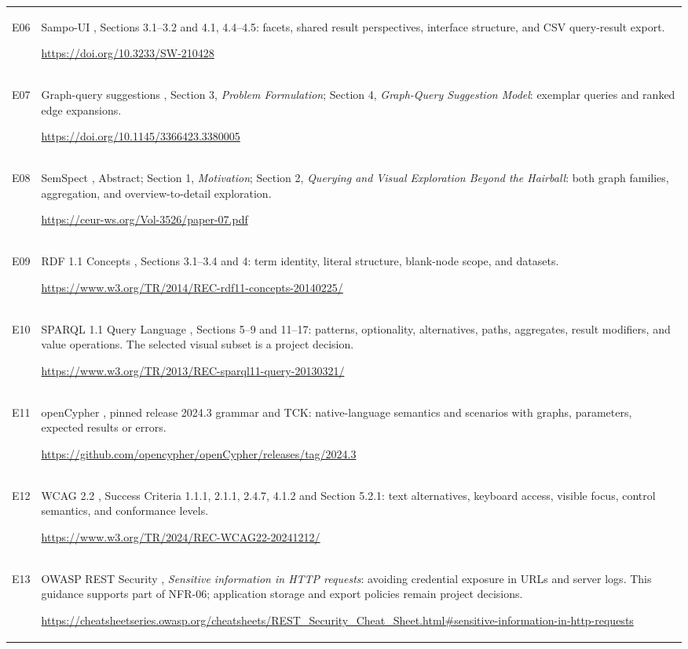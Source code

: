 \documentclass[11pt,a4paper]{article}
\begin{document}
{\begin{longtable}{@{}P{1.1cm}P{14.6cm}@{}}
\hypertarget{evidence:E06}{E06} & Sampo-UI \citep{sampoui}, Sections 3.1--3.2 and 4.1, 4.4--4.5: facets, shared result perspectives, interface structure, and CSV query-result export.\par\smallskip\url{https://doi.org/10.3233/SW-210428}\\
\hypertarget{evidence:E07}{E07} & Graph-query suggestions \citep{suggestions}, Section 3, \emph{Problem Formulation}; Section 4, \emph{Graph-Query Suggestion Model}: exemplar queries and ranked edge expansions.\par\smallskip\url{https://doi.org/10.1145/3366423.3380005}\\
\hypertarget{evidence:E08}{E08} & SemSpect \citep{semspect}, Abstract; Section 1, \emph{Motivation}; Section 2, \emph{Querying and Visual Exploration Beyond the Hairball}: both graph families, aggregation, and overview-to-detail exploration.\par\smallskip\url{https://ceur-ws.org/Vol-3526/paper-07.pdf}\\
\hypertarget{evidence:E09}{E09} & RDF 1.1 Concepts \citep{rdfconcepts}, Sections 3.1--3.4 and 4: term identity, literal structure, blank-node scope, and datasets.\par\smallskip\url{https://www.w3.org/TR/2014/REC-rdf11-concepts-20140225/}\\
\hypertarget{evidence:E10}{E10} & SPARQL 1.1 Query Language \citep{sparql}, Sections 5--9 and 11--17: patterns, optionality, alternatives, paths, aggregates, result modifiers, and value operations. The selected visual subset is a project decision.\par\smallskip\url{https://www.w3.org/TR/2013/REC-sparql11-query-20130321/}\\
\hypertarget{evidence:E11}{E11} & openCypher \citep{opencypher}, pinned release 2024.3 grammar and TCK: native-language semantics and scenarios with graphs, parameters, expected results or errors.\par\smallskip\url{https://github.com/opencypher/openCypher/releases/tag/2024.3}\\
\hypertarget{evidence:E12}{E12} & WCAG 2.2 \citep{wcag}, Success Criteria 1.1.1, 2.1.1, 2.4.7, 4.1.2 and Section 5.2.1: text alternatives, keyboard access, visible focus, control semantics, and conformance levels.\par\smallskip\url{https://www.w3.org/TR/2024/REC-WCAG22-20241212/}\\
\hypertarget{evidence:E13}{E13} & OWASP REST Security \citep{owasprest}, \emph{Sensitive information in HTTP requests}: avoiding credential exposure in URLs and server logs. This guidance supports part of NFR-06; application storage and export policies remain project decisions.\par\smallskip\url{https://cheatsheetseries.owasp.org/cheatsheets/REST_Security_Cheat_Sheet.html#sensitive-information-in-http-requests}\\
\end{longtable}}
\end{document}
